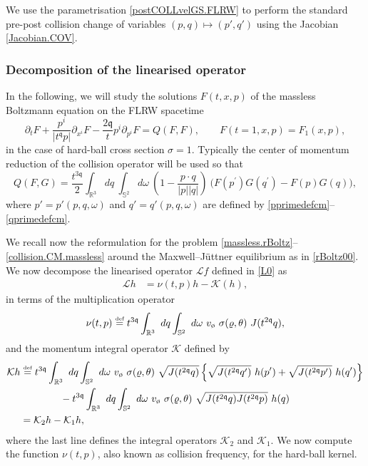 \documentclass[reqno]{amsart}
\newcommand{\eqdef }{\overset{\mbox{\tiny{def}}}{=}}
\newcommand{\pv}{p}
\newcommand{\pZ}{|\pv|}
\newcommand{\qv}{q}
\newcommand{\qZ}{|\qv|}
\newcommand{\qq}{\mathfrak{q}}
\newcommand{\tq}{t^{\qq}}
\newcommand{\tqq}{t^{2\qq}}
\newcommand{\compK}{\mathcal{K}}
\newcommand{\linL}{\mathcal{L}}
\newcommand{\Emptyset}{\text{\o}}
\newcommand{\mrel}{\varrho}
\theoremstyle{definition}
\numberwithin{equation}{section}
\numberwithin{theorem}{section}
\begin{document}
We use the parametrisation \eqref{postCOLLvelGS.FLRW} to perform the standard pre-post collision change of variables $(p,q)\mapsto(p',q')$ using the Jacobian \eqref{Jacobian.COV}. 


\subsubsection{Decomposition of the linearised operator}

In the following, we will study the solutions \(F(t,x,p)\) of the massless Boltzmann equation on the FLRW spacetime 
\begin{equation}\label{massless.rBoltz}
    \partial_t F+ \frac{\pv^i}{|\tq \pv|}\partial_{x^i} F
    -\frac{2\qq }{t} p^i \partial_{p^i} F = Q(F,F), \qquad 
F(t=1, x, p) = F_1(x,p),
\end{equation}
in the case of hard-ball cross section \(\sigma=1\). Typically the center of momentum reduction of the collision operator will be used so that
\begin{equation}\label{collision.CM.massless}
Q(F,G)
=
\frac{t^{3\qq}}{2}
\int_{\mathbb{R}^3}  dq ~
\int_{\mathbb{S}^{2}} d\omega 
~  \left(1 - \frac{p\cdot q}{\pZ\qZ}\right) ~ \big(F(p^{\prime })G(q^{\prime})-F(p)G(q)\big),
\end{equation}
where \(p'=p'(p,q,\omega)\) and \(q'=q'(p,q,\omega)\) are defined by \eqref{pprimedefcm}--\eqref{qprimedefcm}. 



We recall now the reformulation for the problem \eqref{massless.rBoltz}--\eqref{collision.CM.massless} around the Maxwell--J\"uttner equilibrium as in \eqref{rBoltz00}. We now decompose the linearised operator $\linL f$ defined in \eqref{L0} as
\begin{align}
     \linL h
 &  =
 \nu(t,p) h-\compK (h),\label{decomlinop}
\end{align}
in terms of the multiplication operator
\begin{equation}
    \nu(t,p) \eqdef
t^{3\qq}\int_{\mathbb{R}^3} ~  dq 
\int_{\mathbb{S}^{2}} ~ d\omega
~ v_{\Emptyset} ~  \sigma(\mrel,\theta )~ J(\tqq\qv),
\label{nuDEF}
\end{equation}
and the momentum integral operator \(\mathcal{K}\) defined by 
\begin{align}
\compK h 
&\eqdef
t^{3\qq}\int_{\mathbb{R}^3} ~  dq 
\int_{\mathbb{S}^{2}} ~ d\omega
~ v_{\Emptyset} ~ \sigma(\mrel,\theta )~ 
\sqrt{J(\tqq \qv)}\left\{ \sqrt{J(\tqq q^{\prime})} ~ h(p^{\prime })+\sqrt{J(\tqq p^{\prime})} ~ h( q^{\prime})\right\}
\notag
\\
&\qquad \qquad -t^{3\qq}\int_{\mathbb{R}^3} ~  dq 
\int_{\mathbb{S}^{2}} ~ d\omega
~ v_{\Emptyset} ~\sigma(\mrel,\theta )  
~ \sqrt{J(\tqq\qv) J(\tqq\pv)} ~ h(q)
\label{compactK}
\\
&=
\compK_2 h - \compK_1 h,
\notag
\end{align}
where the last line defines the integral operators \(\compK_2 \) and \(\compK_1 \). We now compute the function \(\nu(t,p)\), also known as collision frequency, for the hard-ball kernel.
\end{document}
